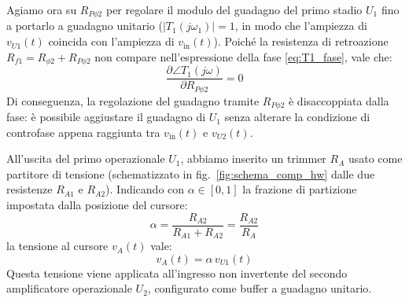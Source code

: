 \documentclass[11pt,a4paper]{article}
\begin{document}
\vspace{0.3cm}
\noindent Agiamo ora su $R_{P\phi 2}$ per regolare il modulo del guadagno del primo stadio $U_1$ fino a portarlo a guadagno unitario ($|T_1(j\omega_1)| = 1$, in modo che l'ampiezza di $v_{U1}(t)$ coincida con l'ampiezza di $v_{\text{in}}(t)$). Poiché la resistenza di retroazione $R_{f1} = R_{\phi 2} + R_{P\phi 2}$ non compare nell'espressione della fase \eqref{eq:T1_fase}, vale che:
\begin{equation}
    \frac{\partial \angle T_1(j\omega)}{\partial R_{P\phi 2}} = 0
\end{equation}
Di conseguenza, la regolazione del guadagno tramite $R_{P\phi 2}$ è disaccoppiata dalla fase: è possibile aggiustare il guadagno di $U_1$ senza alterare la condizione di controfase appena raggiunta tra $v_{\text{in}}(t)$ e $v_{U2}(t)$.

\vspace{0.3cm}
\noindent All'uscita del primo operazionale $U_1$, abbiamo inserito un trimmer $R_A$ usato come partitore di tensione (schematizzato in fig.~\ref{fig:schema_comp_hw} dalle due resistenze $R_{A1}$ e $R_{A2}$). Indicando con $\alpha \in [0, 1]$ la frazione di partizione impostata dalla posizione del cursore:
\begin{equation}
    \alpha = \frac{R_{A2}}{R_{A1} + R_{A2}} = \frac{R_{A2}}{R_A}
\end{equation}
la tensione al cursore $v_A(t)$ vale:
\begin{equation}
    v_A(t) = \alpha \, v_{U1}(t)
\end{equation}
Questa tensione viene applicata all'ingresso non invertente del secondo amplificatore operazionale $U_2$, configurato come buffer a guadagno unitario.
\end{document}
